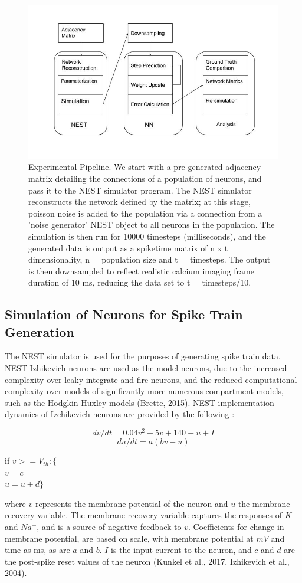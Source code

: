 \documentclass[11pt]{article}
\begin{document}
\begin{figure}[H]
\centering
	\includegraphics[scale=0.4]{./Figures/SPROJModel.jpg}
	\caption{Experimental Pipeline. We start with a pre-generated adjacency matrix detailing the connections of a population of neurons, and pass it to the NEST simulator program. The NEST simulator reconstructs the network defined by the matrix; at this stage, poisson noise is added to the population via a connection from a 'noise generator' NEST object to all neurons in the population. The simulation is then run for 10000 timesteps (milliseconds), and the generated data is output as a spiketime matrix of n x t dimensionality, n = population size and t = timesteps. The output is then downsampled to reflect realistic calcium imaging frame duration of 10 ms, reducing the data set to t = timesteps/10.}
\end{figure}

\subsection{Simulation of Neurons for Spike Train Generation}
The NEST simulator is used for the purposes of generating spike train data. NEST Izhikevich neurons are used as the model neurons, due to the increased complexity over leaky integrate-and-fire neurons, and the reduced computational complexity over models of significantly more numerous compartment models, such as the Hodgkin-Huxley models (Brette, 2015). NEST implementation dynamics of Izchikevich neurons are provided by the following :

$$dv/dt=0.04v^2+5v+140-u+I$$
$$du/dt=a(bv-u)$$
\smallskip

{\centering
if $v >= V_{th}:\{$\\
$v = c$\\
$u = u + d\}$\par
}
where $v$ represents the membrane potential of the neuron and $u$ the membrane recovery variable. The membrane recovery variable captures the responses of $K^{+}$ and $Na^{+}$, and is a source of negative feedback to $v$. Coefficients for change in membrane potential, are based on scale, with membrane potential at $mV$ and time as ms, as are $a$ and $b$. $I$ is the input current to the neuron, and $c$ and $d$ are the post-spike reset values of the neuron (Kunkel et al., 2017, Izhikevich et al., 2004). 
\end{document}
